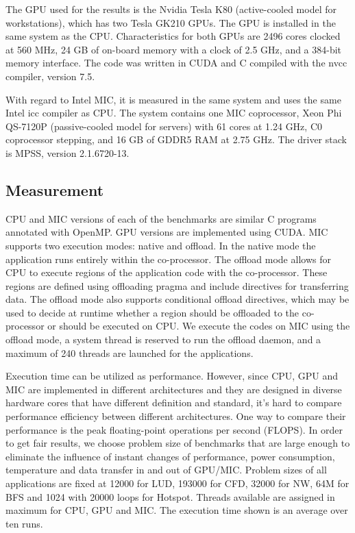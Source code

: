 
The GPU used for the results is the Nvidia Tesla K80 (active-cooled model for workstations), which has two Tesla GK210 GPUs. The GPU 
is installed in the same system as the CPU. 
Characteristics for both GPUs are 2496 cores clocked at 560 MHz, 24 GB of on-board memory with a clock of 2.5 GHz, and a 384-bit memory interface. The code was written in CUDA and C compiled with the nvcc compiler, version 7.5. 


With regard to Intel MIC, it is measured in the same system and uses the same Intel icc compiler as CPU. 
The system contains one MIC coprocessor, Xeon Phi QS-7120P (passive-cooled model for servers) with 61 cores at 1.24 GHz, C0 coprocessor stepping, and 16 GB of GDDR5 RAM at 2.75 GHz. The driver stack is MPSS, version 2.1.6720-13. 

\subsection{Measurement}

CPU and MIC versions of each of the benchmarks are similar C programs annotated with OpenMP. 
GPU versions are implemented using CUDA. MIC supports two execution modes: native and offload. 
In the native mode the application runs entirely within the co-processor. The offload mode allows for CPU to execute regions of the application code with the co-processor. These regions are defined using offloading pragma and include directives for transferring data. The offload mode also supports conditional offload directives, which may be used to decide at runtime whether a region should be offloaded to the co-processor or should be executed on CPU. We execute the codes on MIC using the offload mode, a system thread 
is reserved to run the offload daemon, and a maximum of 240 threads are launched for the applications.

Execution time can be utilized as performance. However, since CPU, GPU and MIC are implemented in different architectures and they are designed in diverse hardware cores that have different definition and standard, it's hard to compare performance efficiency between different architectures. One way to compare their performance is the peak floating-point operations per second (FLOPS). In order to get fair results, we choose problem size of benchmarks that are large enough to eliminate the influence of instant changes of performance, power consumption, temperature and data transfer in and out of GPU/MIC. Problem sizes of all applications are fixed at 12000 for LUD, 193000 for CFD, 32000 for NW, 64M for BFS and 1024 with 20000 loops for Hotspot. Threads available are assigned in maximum for CPU, GPU and MIC. The execution time shown is an average over ten runs.


